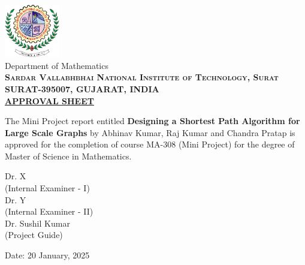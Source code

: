 \newpage



\begin{center}
	\includegraphics[width=0.18\textwidth]{./svnit-logo}\\[0.1in]
	\huge{Department of Mathematics}\\[0.1cm]
	\normalsize
	\textbf{\textsc{Sardar Vallabhbhai National Institute of Technology, Surat \\ SURAT-395007, GUJARAT, INDIA}}\\[1.5cm]
	
	\textbf{\LARGE \underline{APPROVAL SHEET}}\\[0.5cm]
\end{center}

\begin{justify}
	\normalsize The Mini Project report entitled \textbf{Designing a Shortest Path Algorithm for Large Scale Graphs} 
	by Abhinav Kumar, Raj Kumar and Chandra Pratap is approved for the completion 
	of course MA-308 (Mini Project) for the degree of Master of Science in Mathematics.
\end{justify}

\vfill


\begin{flushright}
	
	Dr. X\\
	(Internal Examiner - I)\\[1.5cm]
	Dr. Y\\
	(Internal Examiner - II)\\[1.5cm]
	Dr. Sushil Kumar\\
	(Project Guide)\\
\end{flushright}

\vfill

\begin{flushleft}
	Date: 20 January, 2025
\end{flushleft}